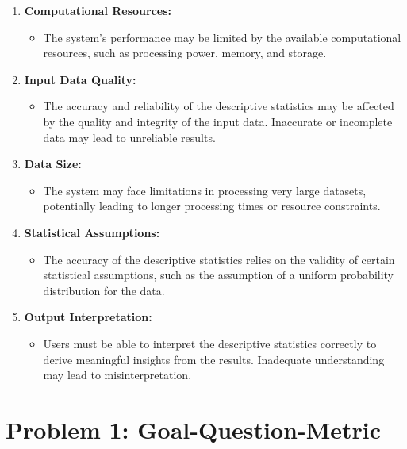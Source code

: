 \documentclass[english,12pt,a4paper]{report}
\begin{document}
	\begin{enumerate}
		
	\item \textbf{Computational Resources:} 
	\begin{itemize}
		\item The system's performance may be limited by the available computational resources, such as processing power, memory, and storage.
	\end{itemize}

	\item \textbf{Input Data Quality:} 
	\begin{itemize}
		\item The accuracy and reliability of the descriptive statistics may be affected by the quality and integrity of the input data. Inaccurate or incomplete data may lead to unreliable results.
	\end{itemize}

	\item \textbf{Data Size:} 
	\begin{itemize}
		\item The system may face limitations in processing very large datasets, potentially leading to longer processing times or resource constraints.
	\end{itemize}

	\item \textbf{Statistical Assumptions:} 
	\begin{itemize}
		\item The accuracy of the descriptive statistics relies on the validity of certain statistical assumptions, such as the assumption of a uniform probability distribution for the data.
	\end{itemize}
	
	\item \textbf{Output Interpretation:} 
	\begin{itemize}
		\item Users must be able to interpret the descriptive statistics correctly to derive meaningful insights from the results. Inadequate understanding may lead to misinterpretation.
	\end{itemize}

	\end{enumerate}
	
	\chapter{Problem 1: Goal-Question-Metric}
	
	
\end{document}
